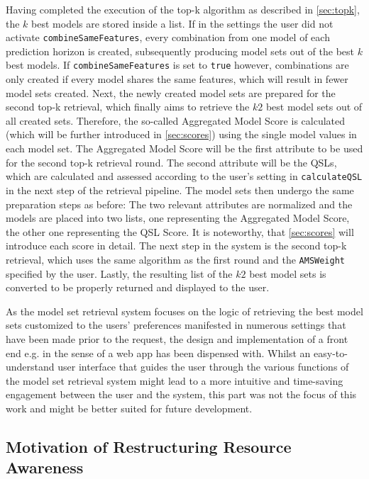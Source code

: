 Having completed the execution of the top-k algorithm as described in \autoref{sec:topk}, the $k$ best models are stored inside a list. If in the settings the user did not activate \texttt{combineSameFeatures},  every combination from one model of each prediction horizon is created, subsequently producing model sets out of the best $k$ best models. If \texttt{combineSameFeatures} is set to \texttt{true} however, combinations are only created if every model shares the same features, which will result in fewer model sets created. Next, the newly created model sets are prepared for the second top-k retrieval, which finally aims to retrieve the $k2$ best model sets out of all created sets. Therefore, the so-called Aggregated Model Score is calculated (which will be further introduced in \autoref{sec:scores}) using the single model values in each model set. The Aggregated Model Score will be the first attribute to be used for the second top-k retrieval round. The second attribute will be the QSLs, which are calculated and assessed according to the user's setting in \texttt{calculateQSL} in the next step of the retrieval pipeline. The model sets then undergo the same preparation steps as before: The two relevant attributes are normalized and the models are placed into two lists, one representing the Aggregated Model Score, the other one representing the QSL Score. It is noteworthy, that \autoref{sec:scores} will introduce each score in detail. The next step in the system is the second top-k retrieval, which uses the same algorithm as the first round and the \texttt{AMSWeight} specified by the user. Lastly, the resulting list of the $k2$ best model sets is converted to be properly returned and displayed to the user.

As the model set retrieval system focuses on the logic of retrieving the best model sets customized to the users' preferences manifested in numerous settings that have been made prior to the request, the design and implementation of a front end e.g. in the sense of a web app has been dispensed with. Whilst an easy-to-understand user interface that guides the user through the various functions of the model set retrieval system might lead to a more intuitive and time-saving engagement between the user and the system, this part was not the focus of this work and might be better suited for future development.



\subsection{Motivation of Restructuring Resource Awareness}\label{sec:motivationRA}

